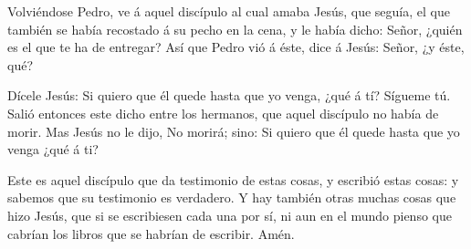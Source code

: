  Volviéndose Pedro, ve á aquel discípulo al cual amaba
Jesús, que seguía, el que también se había recostado á su pecho en la
cena, y le había dicho: Señor, ¿quién es el que te ha de entregar?
 Así que Pedro vió á éste, dice á Jesús: Señor, ¿y éste,
qué?

 Dícele Jesús: Si quiero que él quede hasta que yo venga,
¿qué á tí? Sígueme tú.  Salió entonces este dicho entre
los hermanos, que aquel discípulo no había de morir. Mas Jesús no le
dijo, No morirá; sino: Si quiero que él quede hasta que yo venga ¿qué á
ti?

 Este es aquel discípulo que da testimonio de estas
cosas, y escribió estas cosas: y sabemos que su testimonio es verdadero.
 Y hay también otras muchas cosas que hizo Jesús, que si
se escribiesen cada una por sí, ni aun en el mundo pienso que cabrían
los libros que se habrían de escribir. Amén.
